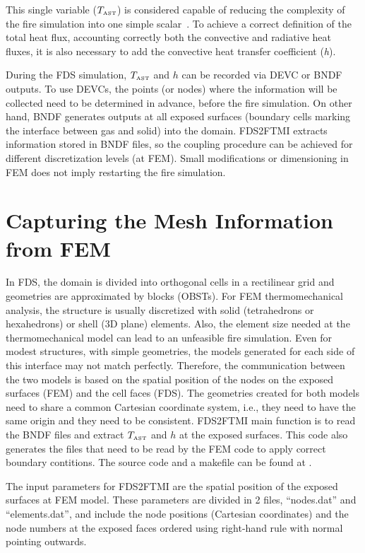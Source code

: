 \documentclass[11pt]{book}
\begin{document}
This single variable ($T_{\hbox{\tiny AST}}$) is considered capable of reducing the complexity of the fire simulation into one simple scalar~\cite{FTMI:Duthinh,FTMI:Sandstrom,FTMI:Wickstrom2010}. To achieve a correct definition of the total heat flux, accounting correctly both the convective and radiative heat fluxes, it is also necessary to add the convective heat transfer coefficient (\textit{h}). 
 
During the FDS simulation, $T_{\hbox{\tiny AST}}$ and $h$ can be recorded via {\ct DEVC} or {\ct BNDF} outputs. To use {\ct DEVC}s, the points (or nodes) where the information will be collected need to be determined in advance, before the fire simulation. On other hand, {\ct BNDF} generates outputs at all exposed surfaces (boundary cells marking the interface between gas and solid) into the domain. FDS2FTMI extracts information stored in {\ct BNDF} files, so the coupling procedure can be achieved for different discretization levels (at FEM). Small modifications or dimensioning in FEM does not imply restarting the fire simulation. 
  
\section{Capturing the Mesh Information from FEM}

In FDS, the domain is divided into orthogonal cells in a rectilinear grid and geometries are approximated by blocks ({\ct OBST}s). For FEM thermomechanical analysis, the structure is usually discretized with solid (tetrahedrons or hexahedrons) or shell (3D plane) elements. Also, the element size needed at the thermomechanical model can lead to an unfeasible fire simulation. Even for modest structures, with simple geometries, the models generated for each side of this interface may not match perfectly. Therefore, the communication between the two models is based on the spatial position of the nodes on the exposed surfaces (FEM) and the cell faces (FDS). The geometries created for both models need to share a common Cartesian coordinate system, i.e., they need to have the same origin and they need to be consistent. FDS2FTMI main function is to read the {\ct BNDF} files and extract $T_{\hbox{\tiny AST}}$ and $h$ at the exposed surfaces. This code also generates the files that need to be read by the FEM code to apply correct boundary contitions. The source code and a makefile can be found at . 

The input parameters for FDS2FTMI are the spatial position of the exposed surfaces at FEM model. These parameters are divided in 2 files, ``nodes.dat'' and ``elements.dat'', and include the node positions (Cartesian coordinates) and the node numbers at the exposed faces ordered using right-hand rule with normal pointing outwards. 
\end{document}

